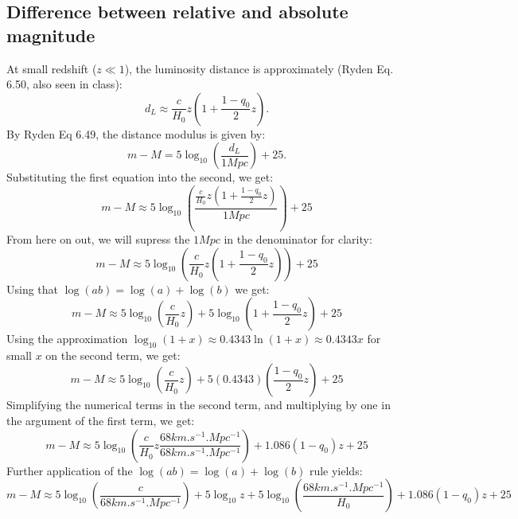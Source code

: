 \subsection{Difference between relative and absolute magnitude}
At small redshift ($z \ll 1$), the luminosity distance is approximately (Ryden Eq. 6.50, also seen in class):
\begin{equation}
    d_L \approx \frac{c}{H_0}z\left(1 + \frac{1 - q_0}{2}z\right).
\end{equation}
By Ryden Eq 6.49, the distance modulus is given by:
\begin{equation}
    m - M = 5\log_{10}\left(\frac{d_L}{1\si{Mpc}}\right) + 25.
\end{equation}
Substituting the first equation into the second, we get:
\begin{equation}
    m - M \approx 5\log_{10}\left(\frac{\frac{c}{H_0}z\left(1 + \frac{1 - q_0}{2}z\right)}{1\si{Mpc}}\right) +  25
\end{equation}
From here on out, we will supress the $1\si{Mpc}$ in the denominator for clarity:
\begin{equation}
    m - M \approx 5\log_{10}\left(\frac{c}{H_0}z\left(1 + \frac{1 - q_0}{2}z\right)\right) +  25
\end{equation}
Using that $\log(ab) = \log(a) + \log(b)$ we get:
\begin{equation}
    m - M \approx 5\log_{10}\left(\frac{c}{H_0}z\right) + 5\log_{10}\left(1 + \frac{1 - q_0}{2}z\right) +  25
\end{equation}
Using the approximation $\log_{10}(1 + x) \approx 0.4343\ln(1 + x) \approx 0.4343x$ for small $x$ on the second term, we get:
\begin{equation}
    m - M \approx 5\log_{10}\left(\frac{c}{H_0}z\right) + 5(0.4343)(\frac{1 - q_0}{2}z) +  25 
\end{equation}
Simplifying the numerical terms in the second term, and multiplying by one in the argument of the first term, we get:
\begin{equation}
    m - M \approx 5\log_{10}\left(\frac{c}{H_0}z \frac{68 \si{km.s^{-1}.Mpc^{-1}}}{68 \si{km.s^{-1}.Mpc^{-1}}}\right) + 1.086(1-q_0)z +  25 
\end{equation}
Further application of the $\log(ab) = \log(a) + \log(b)$ rule yields:
\begin{equation}
    m - M \approx 5\log_{10}\left(\frac{c}{68 \si{km.s^{-1}.Mpc^{-1}}}\right) + 5\log_{10}z + 5\log_{10}\left(\frac{68 \si{km.s^{-1}.Mpc^{-1}}}{H_0}\right) + 1.086(1-q_0)z +  25
\end{equation}
